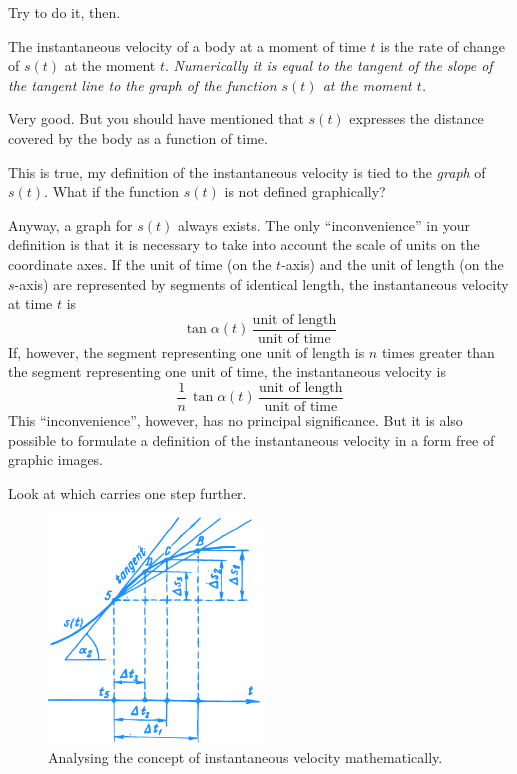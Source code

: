 {\athr Try to do it, then.

\rdr The instantaneous velocity of a body at a moment of time $t$ is the rate of change of $s (t)$ at the moment $t$. \emph{Numerically it is equal to the tangent of the slope of the tangent line to the graph of the function $s (t)$ at the moment $t$.}

\athr Very good. But you should have mentioned that $s(t)$ expresses the distance covered by the body as a function of time.

\rdr This is true, my definition of the instantaneous velocity is tied to the \emph{graph} of $s (t)$. What if the function $s (t)$ is not defined graphically?

\athr Anyway, a graph for $s (t)$ always exists. The only ``inconvenience'' in your definition is that it is necessary to take into account the scale of units on the coordinate axes. If the unit of time (on the $t$-axis) and the unit of length (on the $s$-axis) are represented by segments of identical length, the instantaneous velocity at time $t$ is
\begin{equation*}%
\tan \alpha (t) \, \dfrac{\text{unit of length}}{\text{unit of time}}
\end{equation*}
If, however, the segment representing one unit of length is $n$ times greater than the segment representing one unit of time, the instantaneous velocity is
\begin{equation*}%
\frac{1}{n} \, \tan \alpha (t) \, \dfrac{\text{unit of length}}{\text{unit of time}}
\end{equation*}
This ``inconvenience'', however, has no principal significance. But it is also possible to formulate a definition of the instantaneous velocity in a form free of graphic images.

Look at  which carries  one step further.
\begin{figure}[!ht]%
\centering
\includegraphics[width=0.5\textwidth]{figures/fig-34.pdf}
\caption{Analysing the concept of instantaneous velocity mathematically.}
\label{fig-34}
\end{figure}

}

